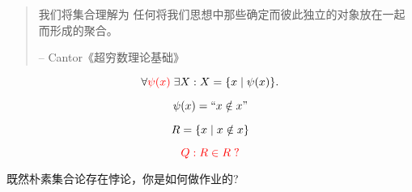 
\begin{frame}{}

  \begin{columns}
    \pause
    \pause
    \pause
  \end{columns}
\end{frame}

\begin{frame}{}
  \begin{quote}
    我们将集合理解为
    任何将我们思想中那些确定而彼此独立的对象放在一起而形成的聚合。

    \hfill -- Cantor《超穷数理论基础》
  \end{quote}

  \pause
  \vspace{1.00cm}
  \begin{theorem}[概括原则]
    \[
      \forall \textcolor{red}{\psi(x)}\; \exists X: X = \{x \mid \psi(x)\}.
    \]
  \end{theorem}
\end{frame}

\begin{frame}{}
  \begin{definition}
    \[
      \psi(x) = ``x \notin x"
    \]

    \pause
    \[
      R = \{x \mid x \notin x\}
    \]

    \pause
    \[
      \textcolor{red}{Q: R \in R\;?}
    \]
  \end{definition}
\end{frame}

\begin{frame}{}
  \begin{center}
     既然朴素集合论存在悖论，你是如何做作业的?
    \vspace{0.60cm}
  \end{center}
\end{frame}

